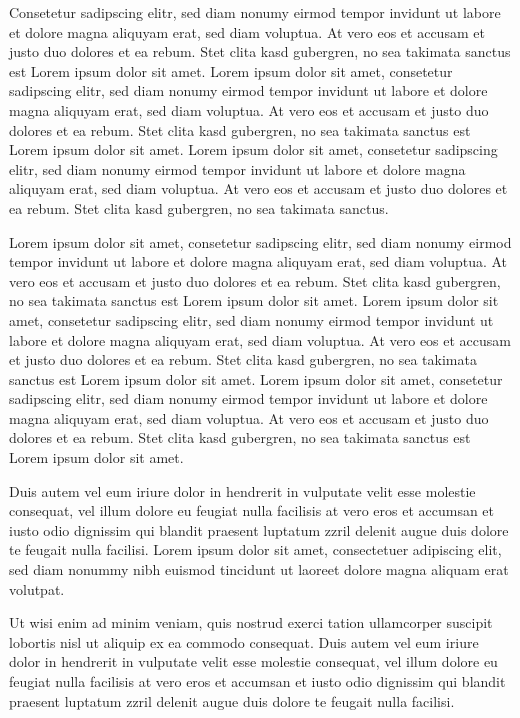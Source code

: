 Consetetur sadipscing elitr, sed diam nonumy eirmod tempor invidunt ut labore et dolore magna aliquyam erat, sed diam voluptua. At vero eos et accusam et justo duo dolores et ea rebum. Stet clita kasd gubergren, no sea takimata sanctus est Lorem ipsum dolor sit amet. Lorem ipsum dolor sit amet, consetetur sadipscing elitr, sed diam nonumy eirmod tempor invidunt ut labore et dolore magna aliquyam erat, sed diam voluptua. At vero eos et accusam et justo duo dolores et ea rebum. Stet clita kasd gubergren, no sea takimata sanctus est Lorem ipsum dolor sit amet. Lorem ipsum dolor sit amet, consetetur sadipscing elitr, sed diam nonumy eirmod tempor invidunt ut labore et dolore magna aliquyam erat, sed diam voluptua. At vero eos et accusam et justo duo dolores et ea rebum. Stet clita kasd gubergren, no sea takimata sanctus.  

Lorem ipsum dolor sit amet, consetetur sadipscing elitr, sed diam nonumy eirmod tempor invidunt ut labore et dolore magna aliquyam erat, sed diam voluptua. At vero eos et accusam et justo duo dolores et ea rebum. Stet clita kasd gubergren, no sea takimata sanctus est Lorem ipsum dolor sit amet. Lorem ipsum dolor sit amet, consetetur sadipscing elitr, sed diam nonumy eirmod tempor invidunt ut labore et dolore magna aliquyam erat, sed diam voluptua. At vero eos et accusam et justo duo dolores et ea rebum. Stet clita kasd gubergren, no sea takimata sanctus est Lorem ipsum dolor sit amet. Lorem ipsum dolor sit amet, consetetur sadipscing elitr, sed diam nonumy eirmod tempor invidunt ut labore et dolore magna aliquyam erat, sed diam voluptua. At vero eos et accusam et justo duo dolores et ea rebum. Stet clita kasd gubergren, no sea takimata sanctus est Lorem ipsum dolor sit amet.  

Duis autem vel eum iriure dolor in hendrerit in vulputate velit esse molestie consequat, vel illum dolore eu feugiat nulla facilisis at vero eros et accumsan et iusto odio dignissim qui blandit praesent luptatum zzril delenit augue duis dolore te feugait nulla facilisi. Lorem ipsum dolor sit amet, consectetuer adipiscing elit, sed diam nonummy nibh euismod tincidunt ut laoreet dolore magna aliquam erat volutpat.  

Ut wisi enim ad minim veniam, quis nostrud exerci tation ullamcorper suscipit lobortis nisl ut aliquip ex ea commodo consequat. Duis autem vel eum iriure dolor in hendrerit in vulputate velit esse molestie consequat, vel illum dolore eu feugiat nulla facilisis at vero eros et accumsan et iusto odio dignissim qui blandit praesent luptatum zzril delenit augue duis dolore te feugait nulla facilisi.  

